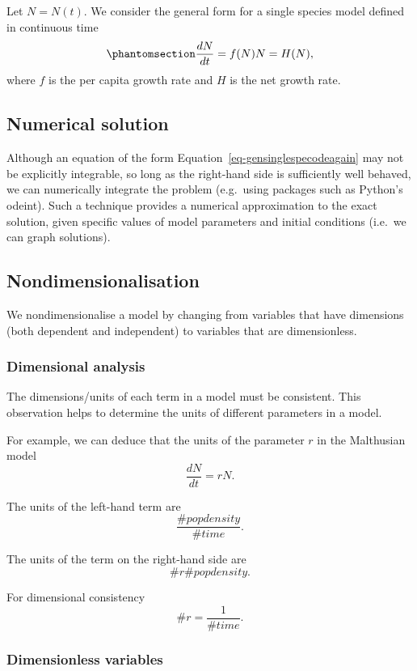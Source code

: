 \documentclass[
  letterpaper,
  DIV=11,
  numbers=noendperiod]{scrreprt}
\begin{document}
Let \(N=N(t)\). We consider the general form for a single species model
defined in continuous time
\begin{equation}\protect\phantomsection\label{eq-gensinglespecodeagain}{
\frac{dN}{dt}=f(N)N=H(N),
}\end{equation} where \(f\) is the per capita growth rate and \(H\) is
the net growth rate.

\subsection{Numerical solution}\label{numerical-solution-2}

Although an equation of the form Equation~\ref{eq-gensinglespecodeagain}
may not be explicitly integrable, so long as the right-hand side is
sufficiently well behaved, we can numerically integrate the problem
(e.g.~using packages such as Python's odeint). Such a technique provides
a numerical approximation to the exact solution, given specific values
of model parameters and initial conditions (i.e.~we can graph
solutions).

\subsection{Nondimensionalisation}\label{nondimensionalisation-1}

We nondimensionalise a model by changing from variables that have
dimensions (both dependent and independent) to variables that are
dimensionless.

\subsubsection{Dimensional analysis}\label{dimensional-analysis-1}

The dimensions/units of each term in a model must be consistent. This
observation helps to determine the units of different parameters in a
model.

For example, we can deduce that the units of the parameter \(r\) in the
Malthusian model \[
\frac{dN}{dt}=rN.
\] \vspace{5cm}

The units of the left-hand term are \[
\frac{\# pop density}{\# time}.
\]

The units of the term on the right-hand side are \[
\#r\#popdensity.
\]

For dimensional consistency \[
\#r = \frac{1}{\#time}.
\]

\subsubsection{Dimensionless variables}\label{dimensionless-variables}
\end{document}

